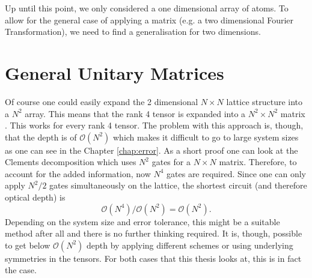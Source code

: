 Up until this point, we only considered a one dimensional array of atoms. To allow for the general case of applying a matrix (e.g. a two dimensional Fourier Transformation), we need to find a generalisation for two dimensions.

\section{General Unitary Matrices}
Of course one could easily expand the 2 dimensional $N\times N$ lattice structure into a $N^2$ array. This means that the rank 4 tensor is expanded into a $N^2\times N^2$ matrix \cite{tensorunfold}. This works for every rank 4 tensor. The problem with this approach is, though, that the depth is of $\mathcal{O}(N^2)$ which makes it difficult to go to large system sizes as one can see in the Chapter \ref{chap:error}. As a short proof one can look at the Clements decomposition which uses $N^2$ gates for a $N\times N$ matrix. Therefore, to account for the added information, now $N^4$ gates are required. Since one can only apply $N^2/2$ gates simultaneously on the lattice, the shortest circuit (and therefore optical depth) is 
\[\mathcal{O}(N^4)/\mathcal{O}(N^2)=\mathcal{O}(N^2).\]
Depending on the system size and error tolerance, this might be a suitable method after all and there is no further thinking required. It is, though, possible to get below $\mathcal{O}(N^2)$ depth by applying different schemes or using underlying symmetries in the tensors. For both cases that this thesis looks at, this is in fact the case.

